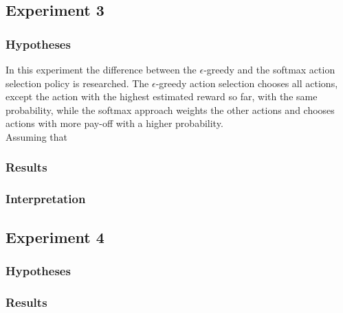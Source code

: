 \documentclass[11pt]{article}
\begin{document}
\subsection{Experiment 3}

\subsubsection{Hypotheses}
In this experiment the difference between the $\epsilon$-greedy and the softmax action selection policy is researched. The $\epsilon$-greedy action selection chooses all actions, except the action with the highest estimated reward so far, with the same probability, while the softmax approach weights the other actions and chooses actions with more pay-off with a higher probability.\\
Assuming that 
\subsubsection{Results}


\subsubsection{Interpretation}


\subsubsection{}

\subsection{Experiment 4}

\subsubsection{Hypotheses}


\subsubsection{Results}
\end{document}

